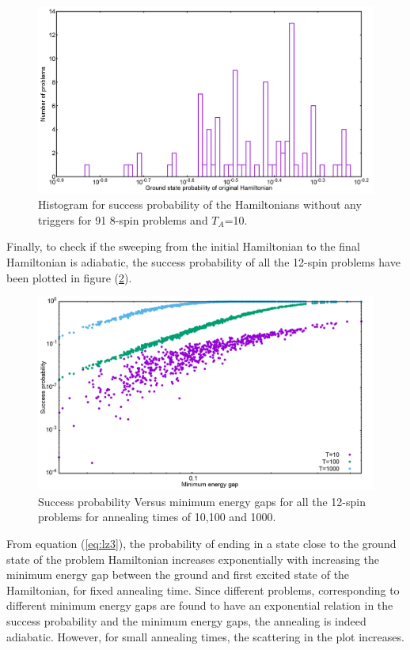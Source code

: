 \documentclass[../main.tex]{subfiles}
\begin{document}
\begin{figure}[H]
\centering 
\includegraphics[scale=0.3]{O_s8_T10_g0.png}
\caption{Histogram for success probability of the Hamiltonians without any triggers for 91 8-spin problems and $T_A$=10.}
\label{fig:o9}
\end{figure}
Finally, to check if the sweeping from the initial Hamiltonian to the final Hamiltonian is adiabatic, the success probability of all the 12-spin problems have been plotted in figure (\ref{fig:o10}).
\begin{figure}[H]
\centering 
\includegraphics[scale=0.3]{GapVsSucc_s12_T10_100_1000.png}
\caption{Success probability Versus minimum energy gaps for all the 12-spin problems for annealing times of 10,100 and 1000.}
\label{fig:o10}
\end{figure}
From equation (\ref{eq:lz3}), the probability of ending in a state close to the ground state of the problem Hamiltonian increases exponentially with increasing the minimum energy gap between the ground and first excited state of the Hamiltonian, for fixed annealing time. Since different problems, corresponding to different minimum energy gaps are found to have an exponential relation in the success probability and the minimum energy gaps, the annealing is indeed adiabatic. However, for small annealing times, the scattering in the plot increases. 
\end{document}
